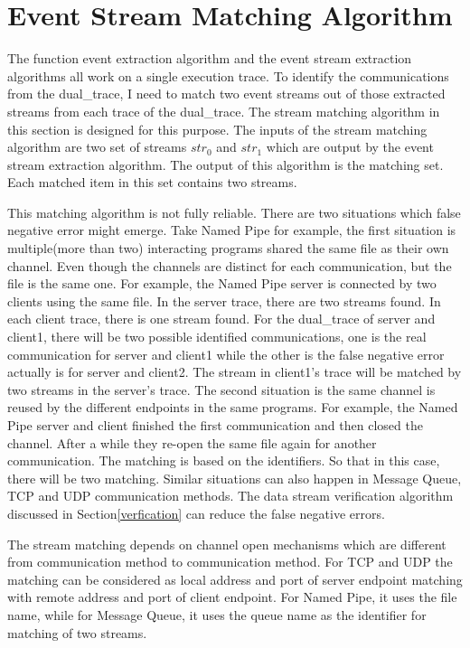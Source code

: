 \section{Event Stream Matching Algorithm}\label{streammatch}
The function event extraction algorithm and the event stream extraction algorithms all work on a single execution trace. To identify the communications from the dual\_trace, I need to match two event streams out of those extracted streams from each trace of the dual\_trace. The stream matching algorithm in this section is designed for this purpose. The inputs of the stream matching algorithm are two set of streams $str_0$ and $str_1$ which are output by the event stream extraction algorithm. The output of this algorithm is the matching set. Each matched item in this set contains two streams. 

This matching algorithm is not fully reliable. There are two situations which false negative error might emerge. Take Named Pipe for example, the first situation is multiple(more than two) interacting programs shared the same file as their own channel. Even though the channels are distinct for each communication, but the file is the same one. For example, the Named Pipe server is connected by two clients using the same file. In the server trace, there are two streams found. In each client trace, there is one stream found. For the dual\_trace of server and client1, there will be two possible identified communications, one is the real communication for server and client1 while the other is the false negative error actually is for server and client2. The stream in client1's trace will be matched by two streams in the server's trace. The second situation is the same channel is reused by the different endpoints in the same programs. For example, the Named Pipe server and client finished the first communication and then closed the channel. After a while they re-open the same file again for another communication. The matching is based on the identifiers. So that in this case, there will be two matching. Similar situations can also happen in Message Queue, TCP and UDP communication methods. The data stream verification algorithm discussed in Section\ref{verfication} can reduce the false negative errors. 

The stream matching depends on channel open mechanisms which are different from communication method to communication method. For TCP and UDP the matching can be considered as local address and port of server endpoint matching with remote address and port of client endpoint. For Named Pipe, it uses the file name, while for Message Queue, it uses the queue name as the identifier for matching of two streams. 

